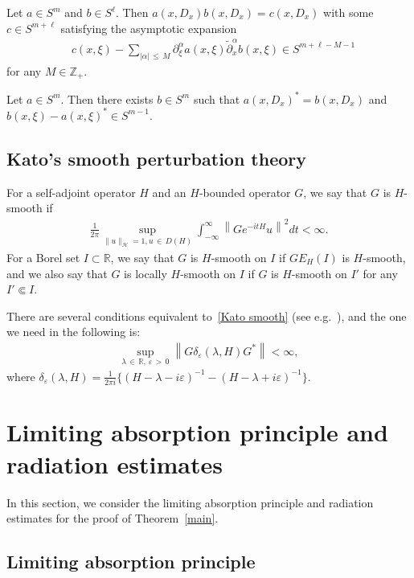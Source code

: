 \documentclass[AHL,Unicode,longabstracts,published]{cedram}
\renewcommand{\a}{\alpha}
\renewcommand{\d}{\delta}
\newcommand{\e}{\varepsilon}
\newcommand{\x}{\xi}
\newcommand{\R}{\mathbb{R}}
\newcommand{\Z}{\mathbb{Z}}
\newcommand{\HS}{\mathcal{H}}
\newcommand{\Z}{\mathbb{Z}}
\newcommand{\R}{\mathbb{R}}
\newcommand{\HS}{\mathcal{H}}
\begin{document}
\begin{lemm}\label{composition lemma}
Let $a\in S^m$ and $b\in S^{\ell}$. Then $a(x,D_x)b(x,D_x)=c(x,D_x)$ with some $c\in S^{m+\ell}$ satisfying the asymptotic expansion
\begin{align*}
&c(x,\x) - \sum_{|\a|\,\leq\,M} \partial_{\x}^\a a(x,\x) \tilde\partial_{x}^\a b(x,\x) \in S^{m+\ell-M-1}
\end{align*}
for any $M\in\Z_+$.
\end{lemm}

\begin{lemm}\label{adjoint lemma}
Let $a\in S^m$. Then there exists $b\in S^m$ such that $a(x,D_x)^*=b(x,D_x)$ and $b(x,\x) - a(x,\x)^* \in S^{m-1}$.
\end{lemm}


\subsection{Kato's smooth perturbation theory} For a self-adjoint operator $H$ and an $H$-bounded operator $G$, we say that $G$ is $H$-smooth if
\begin{align}\label{Kato smooth}
\frac{1}{2\pi}\sup_{\|u\|_{\HS}=1,u\,\in\,D(H)} \int_{-\infty}^\infty \left\| Ge^{-itH}u \right\|^2 dt < \infty.
\end{align}
For a Borel set $I\subset\R$, we say that $G$ is $H$-smooth on $I$ if $GE_H(I)$ is $H$-smooth, and we also say that $G$ is locally $H$-smooth on $I$ if $G$ is $H$-smooth on $I'$ for any $I' \Subset I$.

There are several conditions equivalent to~\eqref{Kato smooth} (see e.g.~\cite{Yg}), and the one we need in the following is:
\begin{align}\label{Kato smooth 2}
\sup_{\lambda\,\in\,\R,\,\e\,>\,0} \left\|G\d_\e(\lambda,H)G^*\right\| <\infty,
\end{align}
where $\d_\e(\lambda,H)=\frac{1}{2\pi i}\{(H-\lambda-i\e)^{-1}-(H-\lambda+i\e)^{-1}\}$.


\section{Limiting absorption principle and radiation estimates}\label{Mourre section}

In this section, we consider the limiting absorption principle and radiation estimates for the proof of Theorem~\ref{main}.


\subsection{Limiting absorption principle}
\end{document}
